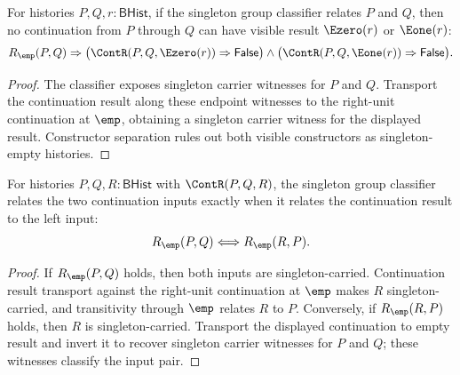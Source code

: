 \begin{theorem}
\label{thm:group-singleton-classifier-continuation-visible-result-absurd}
For histories $P,Q,r:\mathsf{BHist}$, if the singleton group classifier relates
$P$ and $Q$, then no continuation from $P$ through $Q$ can have visible result
$\Ezero(r)$ or $\Eone(r)$:
$$
R_{\emp}(P,Q)\Rightarrow
\bigl(\ContR(P,Q,\Ezero(r))\Rightarrow\mathsf{False}\bigr)\land
\bigl(\ContR(P,Q,\Eone(r))\Rightarrow\mathsf{False}\bigr).
$$
\end{theorem}
\begin{proof}
The classifier exposes singleton carrier witnesses for $P$ and $Q$. Transport
the continuation result along these endpoint witnesses to the right-unit
continuation at $\emp$, obtaining a singleton carrier witness for the displayed
result. Constructor separation rules out both visible constructors as
singleton-empty histories.
\end{proof}

\begin{theorem}
\label{thm:group-singleton-classifier-continuation-result-left}
For histories $P,Q,R:\mathsf{BHist}$ with $\ContR(P,Q,R)$, the singleton group
classifier relates the two continuation inputs exactly when it relates the
continuation result to the left input:
$$
R_{\emp}(P,Q)\Longleftrightarrow R_{\emp}(R,P).
$$
\end{theorem}
\begin{proof}
If $R_{\emp}(P,Q)$ holds, then both inputs are singleton-carried. Continuation
result transport against the right-unit continuation at $\emp$ makes $R$
singleton-carried, and transitivity through $\emp$ relates $R$ to $P$.
Conversely, if $R_{\emp}(R,P)$ holds, then $R$ is singleton-carried. Transport
the displayed continuation to empty result and invert it to recover singleton
carrier witnesses for $P$ and $Q$; these witnesses classify the input pair.
\end{proof}

